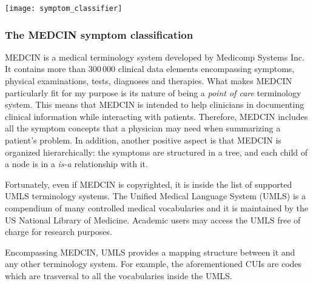 \begin{center}
  \texttt{[image: symptom\_classifier]}
\end{center}

\subsubsection{The MEDCIN symptom classification}
MEDCIN is a medical terminology system developed by Medicomp Systems Inc. It contains more than $300\,000$ clinical data elements encompassing symptoms, physical examinations, tests, diagnoses and therapies. What makes MEDCIN particularly fit for my purpose is its nature of being a \textit{point of care} terminology system. This means that MEDCIN is intended to help clinicians in documenting clinical information while interacting with patients. Therefore, MEDCIN includes all the symptom concepts that a physician may need when summarizing a patient's problem. In addition, another positive aspect is that MEDCIN is organized hierarchically: the symptoms are structured in a tree, and each child of a node is in a \textit{is-a} relationship with it.

Fortunately, even if MEDCIN is copyrighted, it is inside the list of supported UMLS terminology systems. The Unified Medical Language System (UMLS) is a compendium of many controlled medical vocabularies and it is maintained by the US National Library of Medicine. Academic users may access the UMLS free of charge for research purposes.

Encompassing MEDCIN, UMLS provides a mapping structure between it and any other terminology system. For example, the aforementioned CUIs are codes which are trasversal to all the vocabularies inside the UMLS.

